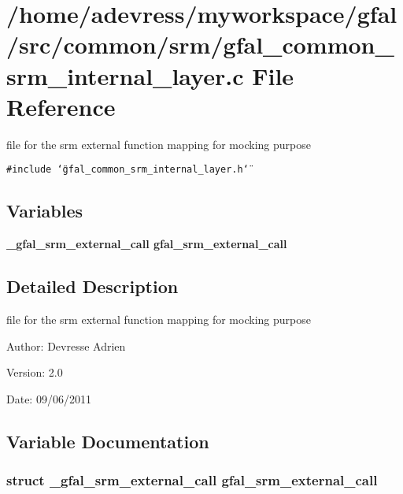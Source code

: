 \section{/home/adevress/myworkspace/gfal/src/common/srm/gfal\_\-common\_\-srm\_\-internal\_\-layer.c File Reference}
\label{gfal__common__srm__internal__layer_8c}
file for the srm external function mapping for mocking purpose 

{\tt \#include \char`\"{}gfal\_\-common\_\-srm\_\-internal\_\-layer.h\char`\"{}}\par
\subsection*{Variables}
\begin{CompactItemize}
\item 
\bf{\_\-gfal\_\-srm\_\-external\_\-call} \textbf{gfal\_\-srm\_\-external\_\-call}
\end{CompactItemize}


\subsection{Detailed Description}
file for the srm external function mapping for mocking purpose 

\begin{Desc}
\item[Author:]Devresse Adrien \end{Desc}
\begin{Desc}
\item[Version:]2.0 \end{Desc}
\begin{Desc}
\item[Date:]09/06/2011 \end{Desc}


\subsection{Variable Documentation}
\subsubsection{\setlength{\rightskip}{0pt plus 5cm}struct \bf{\_\-gfal\_\-srm\_\-external\_\-call} gfal\_\-srm\_\-external\_\-call}\label{gfal__common__srm__internal__layer_8c_67b12c7342043451fc5ce31b1a3d74fb}


